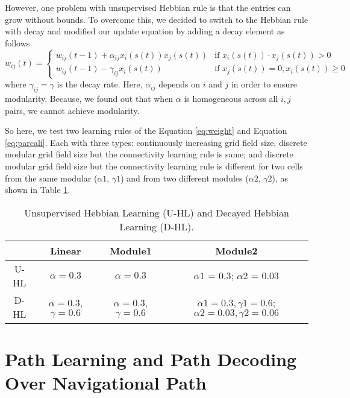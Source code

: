 \documentclass[11pt, letterpaper, onecolumn]{article}
\begin{document}
However, one problem with unsupervised Hebbian rule is that the entries can grow without bounds. To overcome this, we decided to switch to the Hebbian rule with decay and modified our update equation by adding a decay element as follows
\begin{equation}
\label{eq:parcali}
w_{ij}(t) = \begin{cases} 
     		 w_{ij}(t-1) + \alpha_{ij} x_{i}(s(t)) x_{j}(s(t)) & \mbox{if  } x_{i}(s(t)) \cdot x_{j}(s(t))>0 \\
     		 w_{ij}(t-1) - \gamma_{ij} x_{i}(s(t)) & \mbox{if  } x_{j}(s(t))=0, x_{i}(s(t)) \geq 0
  		 	\end{cases}
\end{equation}
where $ \gamma_{ij} = \gamma $ is the decay rate. Here, $ \alpha_{ij} $ depends on $ i $ and $ j $ in order to ensure modularity. Because, we found out that when $ \alpha $ is homogeneous across all $ i,j $ pairs, we cannot achieve modularity.

So here, we test two learning rules of the Equation \ref{eq:weight} and Equation \ref{eq:parcali}. Each with three types: continuously increasing grid field size, discrete modular grid field size but the connectivity learning rule is same; and discrete modular grid field size but the connectivity learning rule is different for two cells from the same modular ($\alpha1$, $\gamma1$) and from two different modules ($\alpha2$, $\gamma2$), as shown in Table \ref{lb:hl}. 

\begin{table}[h]
\centering
\caption{Unsupervised Hebbian Learning (U-HL) and Decayed Hebbian Learning (D-HL). }
\label{lb:hl}
\begin{tabular}{c|c|c|c}
\hline
& Linear      & Module1 & Module2  \\ \hline
       U-HL &  $\alpha = 0.3$ & $\alpha = 0.3$ & $\alpha1$ = 0.3; $\alpha2$ = 0.03 \\ \hline
       D-HL &  $\alpha = 0.3$, $\gamma = 0.6$ & $\alpha = 0.3$, $\gamma = 0.6$ & $\alpha1 = 0.3, \gamma1 = 0.6$; $\alpha2 = 0.03, \gamma2 = 0.06$ \\ \hline
\end{tabular}
\end{table}

\newpage

\section{Path Learning and Path Decoding Over Navigational Path}
\end{document}
